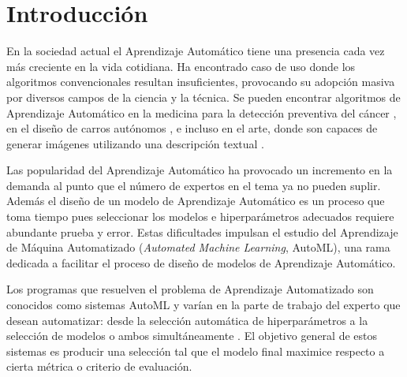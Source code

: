 \chapter*{Introducción}\label{chapter:introduction}
En la sociedad actual el Aprendizaje Autom\'atico tiene una presencia cada vez m\'as creciente en la vida cotidiana. Ha encontrado caso de uso donde los algoritmos convencionales resultan insuficientes, provocando su adopci\'on masiva por diversos campos de la ciencia y la t\'ecnica.
Se pueden encontrar algoritmos de Aprendizaje Autom\'atico en la medicina para la detecci\'on preventiva del c\'ancer , en el dise\~no de carros aut\'onomos , e incluso en el arte, donde son capaces de generar im\'agenes utilizando una descripci\'on textual .

Las popularidad del Aprendizaje Autom\'atico ha provocado un incremento en la demanda al punto que el n\'umero de expertos en el tema ya no pueden suplir. Adem\'as el dise\~no de un modelo de Aprendizaje Autom\'atico es un proceso que toma tiempo pues seleccionar los modelos e hiperpar\'ametros adecuados requiere abundante prueba y error.
Estas dificultades impulsan el estudio del Aprendizaje de M\'aquina Automatizado (\textit{Automated Machine Learning}, AutoML), una rama dedicada a facilitar el proceso de dise\~no de modelos de Aprendizaje Autom\'atico.

Los programas que resuelven el problema de Aprendizaje Automatizado son conocidos como sistemas AutoML y var\'ian en la parte de trabajo del experto que desean automatizar: desde la selecci\'on autom\'atica de hiperpar\'ametros  a la selecci\'on de modelos  o ambos  simult\'aneamente . El objetivo general de estos sistemas es producir una selecci\'on tal que el modelo final maximice respecto a cierta m\'etrica o criterio de evaluaci\'on. 


